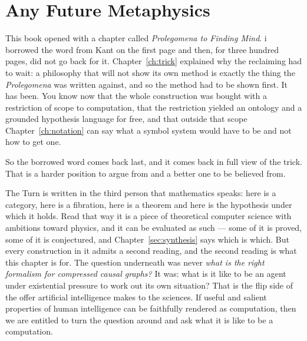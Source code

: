 \chapter{Any Future Metaphysics}
\label{ch:kant}

This book opened with a chapter called \emph{Prolegomena to Finding
Mind}.
i borrowed the word from Kant on the first page and then, for three
hundred pages, did not go back for it.
Chapter~\ref{ch:trick} explained why the reclaiming had to wait:
a philosophy that will not show its own method is exactly the thing
the \emph{Prolegomena} was written against, and so the method had
to be shown first.
It has been.
You know now that the whole construction was bought with a
restriction of scope to computation, that the restriction yielded
an ontology and a grounded hypothesis language for free, and that
outside that scope Chapter~\ref{ch:notation} can say what a symbol
system would have to be and not how to get one.

So the borrowed word comes back last, and it comes back in full
view of the trick.
That is a harder position to argue from and a better one to be
believed from.

The Turn is written in the third person that mathematics speaks:
here is a category, here is a fibration, here is a theorem and here
is the hypothesis under which it holds.
Read that way it is a piece of theoretical computer science with
ambitions toward physics, and it can be evaluated as such --- some
of it is proved, some of it is conjectured, and Chapter~\ref{sec:synthesis}
says which is which.
But every construction in it admits a second reading, and the
second reading is what this chapter is for.
The question underneath was never \emph{what is the right
formalism for compressed causal graphs?}
It was: what is it like to be an agent under existential pressure
to work out its own situation?
That is the flip side of the offer artificial intelligence makes
to the sciences.
If useful and salient properties of human intelligence can be
faithfully rendered as computation, then we are entitled to turn
the question around and ask what it is like to be a computation.

